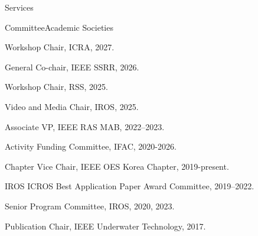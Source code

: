 \begin{rSection}{Services}

\begin{rSubsection}{Committee}{}{Academic Societies}{}
  \item Workshop Chair, ICRA, 2027.
  \item General Co-chair, IEEE SSRR, 2026.
  \item Workshop Chair, RSS, 2025.
  \item Video and Media Chair, IROS, 2025.
  \item Associate VP, IEEE RAS MAB, 2022--2023.
  \item Activity Funding Committee, IFAC, 2020-2026.
  \item Chapter Vice Chair, IEEE OES Korea Chapter, 2019-present.
  \item IROS ICROS Best Application Paper Award Committee, 2019--2022.



  \item Senior Program Committee, IROS, 2020, 2023.


  \item Publication Chair, IEEE Underwater Technology, 2017.

\end{rSubsection}



\end{rSection}
